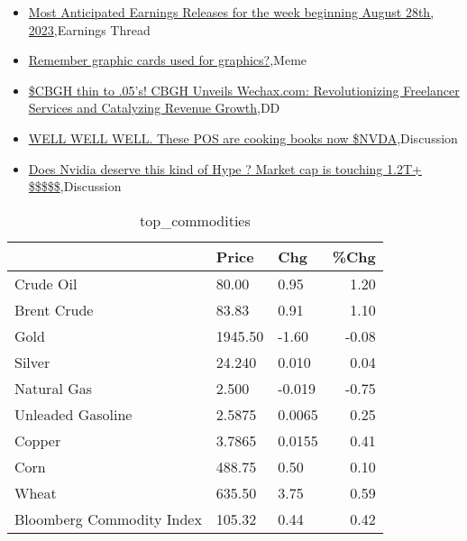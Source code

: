 \documentclass{article}%
\begin{document}
%
\begin{itemize}%
\item%
\href{https://reddit.com/r/wallstreetbets/comments/160yefh/most\_anticipated\_earnings\_releases\_for\_the\_week/}{Most Anticipated Earnings Releases for the week beginning August 28th, 2023},Earnings Thread%
\item%
\href{https://reddit.com/r/wallstreetbets/comments/160vncq/remember\_graphic\_cards\_used\_for\_graphics/}{Remember graphic cards used for graphics?},Meme%
\item%
\href{https://reddit.com/r/Baystreetbets/comments/1603vn0/cbgh\_thin\_to\_05s\_cbgh\_unveils\_wechaxcom/}{\$CBGH thin to .05's! CBGH Unveils Wechax.com: Revolutionizing Freelancer Services and Catalyzing Revenue Growth},DD%
\item%
\href{https://reddit.com/r/StockMarket/comments/160fj4z/well\_well\_well\_these\_pos\_are\_cooking\_books\_now/}{WELL WELL WELL. These POS are cooking books now \$NVDA},Discussion%
\item%
\href{https://reddit.com/r/StockMarket/comments/1603xf7/does\_nvidia\_deserve\_this\_kind\_of\_hype\_market\_cap/}{Does Nvidia deserve this kind of Hype ? Market cap is touching 1.2T+ \$\$\$\$\$},Discussion%
\end{itemize}%


\begin{table}[htbp]%
\caption{top\_commodities}%
\centering%
\begin{adjustbox}{width=1\textwidth}%
\begin{tabular}{lllr}
\toprule
                          &   Price &    Chg &  \%Chg \\
\midrule
               Crude Oil  &   80.00 &   0.95 &  1.20 \\
             Brent Crude  &   83.83 &   0.91 &  1.10 \\
                    Gold  & 1945.50 &  -1.60 & -0.08 \\
                  Silver  &  24.240 &  0.010 &  0.04 \\
             Natural Gas  &   2.500 & -0.019 & -0.75 \\
       Unleaded Gasoline  &  2.5875 & 0.0065 &  0.25 \\
                  Copper  &  3.7865 & 0.0155 &  0.41 \\
                    Corn  &  488.75 &   0.50 &  0.10 \\
                   Wheat  &  635.50 &   3.75 &  0.59 \\
Bloomberg Commodity Index &  105.32 &   0.44 &  0.42 \\
\bottomrule
\end{tabular}
%
\end{adjustbox}%
\end{table}
\end{document}

